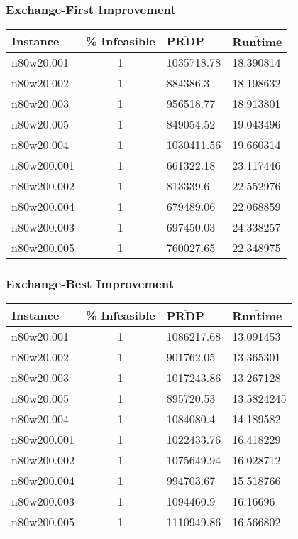 \begin{homeworkProblem}
\subsubsection{Exchange-First Improvement}
\begin{center}
\begin{tabular}{|l|c|l|l|}
\hline
\textbf{Instance}& \textbf{\% Infeasible} & $\mathbf{\bar{PRDP}}$ &$\mathbf{\bar{Runtime}}$\\
\hline
n80w20.001&1&1035718.78&18.390814\\
\hline
n80w20.002&1&884386.3&18.198632\\
\hline
n80w20.003&1&956518.77&18.913801\\
\hline
n80w20.005&1&849054.52&19.043496\\
\hline
n80w20.004&1&1030411.56&19.660314\\
\hline
n80w200.001&1&661322.18&23.117446\\
\hline
n80w200.002&1&813339.6&22.552976\\
\hline
n80w200.004&1&679489.06&22.068859\\
\hline
n80w200.003&1&697450.03&24.338257\\
\hline
n80w200.005&1&760027.65&22.348975\\
\hline
\end{tabular}
\end{center}

\subsubsection{Exchange-Best Improvement}
\begin{center}
\begin{tabular}{|l|c|l|l|}
\hline
\textbf{Instance}& \textbf{\% Infeasible} & $\mathbf{\bar{PRDP}}$ &$\mathbf{\bar{Runtime}}$\\
\hline
n80w20.001&1&1086217.68&13.091453\\
\hline
n80w20.002&1&901762.05&13.365301\\
\hline
n80w20.003&1&1017243.86&13.267128\\
\hline
n80w20.005&1&895720.53&13.5824245\\
\hline
n80w20.004&1&1084080.4&14.189582\\
\hline
n80w200.001&1&1022433.76&16.418229\\
\hline
n80w200.002&1&1075649.94&16.028712\\
\hline
n80w200.004&1&994703.67&15.518766\\
\hline
n80w200.003&1&1094460.9&16.16696\\
\hline
n80w200.005&1&1110949.86&16.566802\\
\hline
\end{tabular}
\end{center}


\end{homeworkProblem}
